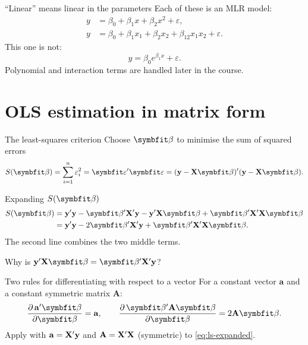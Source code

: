 \begin{frame}{``Linear'' means linear in the parameters}
    Each of these is an MLR model:
    \begin{align*}
        y &= \beta_0 + \beta_1 x + \beta_2 x^2 + \varepsilon, \\
        y &= \beta_0 + \beta_1 x_1 + \beta_2 x_2 + \beta_{12} x_1 x_2 + \varepsilon.
    \end{align*}
    This one is not:
    \[
    y = \beta_0 e^{\beta_1 x} + \varepsilon.
    \]
    Polynomial and interaction terms are handled later in the course.
\end{frame}


\section{OLS estimation in matrix form}


\begin{frame}{The least-squares criterion}
    Choose $\bbeta$ to minimise the sum of squared errors
    \begin{align}
        S(\bbeta) = \sum_{i=1}^n \varepsilon_i^2 = \bvarepsilon'\bvarepsilon = (\by - \bX\bbeta)'(\by - \bX\bbeta). \label{eq:ls-crit}
    \end{align}
\end{frame}


\begin{frame}{Expanding $S(\bbeta)$}
    \begin{align}
        S(\bbeta) &= \by'\by - \bbeta'\bX'\by - \by'\bX\bbeta + \bbeta'\bX'\bX\bbeta \notag\\
        &= \by'\by - 2\bbeta'\bX'\by + \bbeta'\bX'\bX\bbeta. \label{eq:ls-expanded}
    \end{align}
    The second line combines the two middle terms.

    \svspace{1em}

    Why is $\by'\bX\bbeta = \bbeta'\bX'\by$?

\end{frame}


\begin{frame}{Two rules for differentiating with respect to a vector}
    For a constant vector $\mathbf{a}$ and a constant symmetric matrix $\mathbf{A}$:
    \[
    \frac{\partial\, \mathbf{a}'\bbeta}{\partial\bbeta} = \mathbf{a},
    \qquad
    \frac{\partial\, \bbeta'\mathbf{A}\bbeta}{\partial\bbeta} = 2\mathbf{A}\bbeta.
    \]
    Apply with $\mathbf{a}=\mathbf{X}'\mathbf{y}$ and $\mathbf{A}=\mathbf{X}'\mathbf{X}$ (symmetric) to \eqref{eq:ls-expanded}.
\end{frame}


